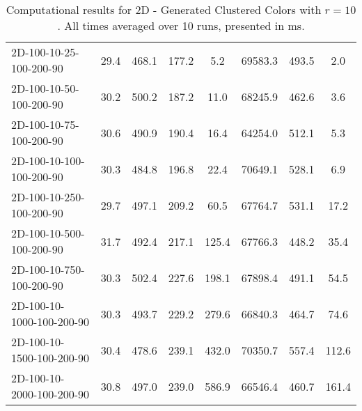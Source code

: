 \documentclass{article}
\begin{document}
\begin{table}[h]
\begin{center}
\begin{tabular}{|l||c|c|c|c|c|c|c|}
            \hline
            2D-100-10-25-100-200-90       & 29.4 & 468.1     & 177.2      & 5.2         & 69583.3  & 493.5     & 2.0        \\
            2D-100-10-50-100-200-90       & 30.2 & 500.2     & 187.2      & 11.0        & 68245.9  & 462.6     & 3.6        \\
            2D-100-10-75-100-200-90       & 30.6 & 490.9     & 190.4      & 16.4        & 64254.0  & 512.1     & 5.3        \\
            2D-100-10-100-100-200-90      & 30.3 & 484.8     & 196.8      & 22.4        & 70649.1  & 528.1     & 6.9        \\
            2D-100-10-250-100-200-90      & 29.7 & 497.1     & 209.2      & 60.5        & 67764.7  & 531.1     & 17.2       \\
            2D-100-10-500-100-200-90      & 31.7 & 492.4     & 217.1      & 125.4       & 67766.3  & 448.2     & 35.4       \\
            2D-100-10-750-100-200-90      & 30.3 & 502.4     & 227.6      & 198.1       & 67898.4  & 491.1     & 54.5       \\
            2D-100-10-1000-100-200-90     & 30.3 & 493.7     & 229.2      & 279.6       & 66840.3  & 464.7     & 74.6       \\
            2D-100-10-1500-100-200-90     & 30.4 & 478.6     & 239.1      & 432.0       & 70350.7  & 557.4     & 112.6      \\
            2D-100-10-2000-100-200-90     & 30.8 & 497.0     & 239.0      & 586.9       & 66546.4  & 460.7     & 161.4      \\
            \hline
        \end{tabular}
    \end{center}
    \caption{Computational results for 2D - Generated Clustered Colors with $r=10$. All times averaged over 10 runs, presented in ms.}
\end{table}
\restoregeometry
\end{document}
